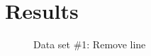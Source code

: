\documentclass[10pt]{report}
\begin{document}
\chapter{Results}
\thispagestyle{fancy}


\begin{figure}[p]
    \centering
    \setlength\fboxsep{0pt}
    \setlength\fboxrule{0pt}
    \caption{Data set \#1: Remove line}
    \label{removelinetable}
\end{figure}
\end{document}
